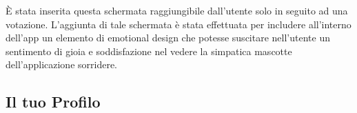 È stata inserita questa schermata raggiungibile dall'utente solo in seguito ad una votazione. L'aggiunta di tale schermata è stata effettuata per includere all'interno dell'app un elemento di emotional design che potesse suscitare nell'utente un sentimento di gioia e soddisfazione nel vedere la simpatica mascotte dell'applicazione sorridere.

\pagebreak

\subsection{Il tuo Profilo}

\begin{figure}[htp]
    \centering
     \quad

\end{figure}
